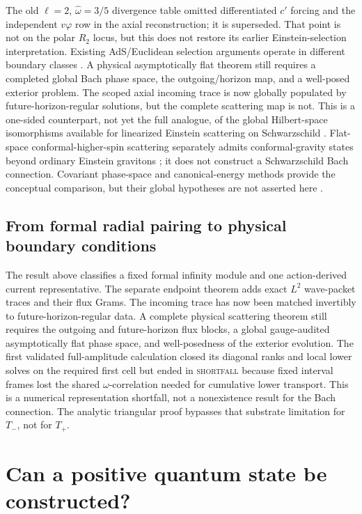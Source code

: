 \documentclass[11pt]{article}
\begin{document}
The old $\ell=2$, $\widehat\omega=3/5$ divergence table omitted differentiated
$c'$ forcing and the independent $v\varphi$ row in the axial reconstruction;
it is superseded.  That point is not on the polar $R_2$ locus, but this does
not restore its earlier Einstein-selection interpretation.  Existing AdS/Euclidean selection
arguments operate in different boundary classes
\cite{Maldacena,LuPangPope}.  A physical asymptotically flat theorem still
requires a completed global Bach phase space, the outgoing/horizon map, and
a well-posed exterior problem.  The scoped axial incoming trace is now
globally populated by future-horizon-regular solutions, but the complete
scattering map is not.  This is a one-sided counterpart, not yet the full
analogue, of the global
Hilbert-space isomorphisms available for linearized Einstein scattering on
Schwarzschild \cite{MasaoodScattering}.  Flat-space conformal-higher-spin
scattering separately admits conformal-gravity states beyond ordinary
Einstein gravitons \cite{AdamoNakachTseytlin}; it does not construct a
Schwarzschild Bach connection.  Covariant
phase-space and canonical-energy methods provide the conceptual comparison,
but their global hypotheses are not asserted here
\cite{IyerWald,HollandsWald}.

\subsection{From formal radial pairing to physical boundary conditions}

The result above classifies a fixed formal infinity module and one
action-derived current representative.  The separate endpoint theorem adds
exact \(L^2\) wave-packet traces and their flux Grams.  The incoming trace
has now been matched invertibly to future-horizon-regular data.  A complete
physical scattering theorem still requires the outgoing and future-horizon
flux blocks, a global gauge-audited asymptotically flat phase space, and
well-posedness of the exterior evolution.  The first validated
full-amplitude calculation closed its diagonal ranks and local lower solves
on the required first cell but ended in \textsc{shortfall} because fixed
interval frames lost the shared \(\omega\)-correlation needed for cumulative
lower transport.  This is a numerical representation shortfall, not a
nonexistence result for the Bach connection.  The analytic triangular proof bypasses that substrate
limitation for \(T_-\), not for \(T_+\).

\section{Can a positive quantum state be constructed?}
\end{document}
